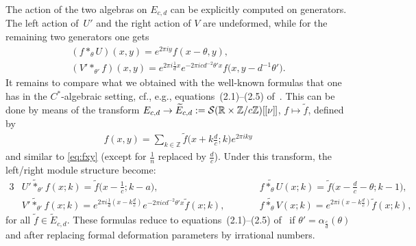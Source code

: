 \documentclass[10pt,a4paper]{amsart}
\numberwithin{equation}{section}
\theoremstyle{definition}
\newcommand{\R}{\mathbb{R}}
\newcommand{\Z}{\mathbb{Z}}
\newcommand{\mc}{\mathcal}
\newcommand{\lbrak}{[\hspace{-0.5pt}[}
\newcommand{\rbrak}{]\hspace{-0.5pt}]}
\renewcommand{\hbar}{\nu}
\begin{document}
The action of the two algebras on $E_{c,d}$ can be explicitly computed on generators.
The left action of~$U'$ and the right action of $V$ are undeformed, while for the remaining two generators one gets
\begin{gather*}
(f\ast_\theta U)(x,y) =e^{2\pi iy}f(x-\theta,y) , \\
(V'\ast_{\theta'} f)(x,y) =e^{2\pi i\frac{1}{d}x}e^{-2\pi icd^{-2}\theta'x}f\big(x,y-d^{-1}\theta'\big) .
\end{gather*}
It remains to compare what we obtained with the well-known formulas that one has in the $C^*$-algebraic setting, cf., e.g., equations~(2.1)--(2.5) of~\cite{Pla06}.
This can be done by means of the transform
$E_{c,d}\to\widetilde{E}_{c,d}:=\mc{S}(\R\times\Z/c\Z)\lbrak\hbar\rbrak$, $f\mapsto\widetilde{f}$, def\/ined by
\begin{gather*}
f(x,y)=\sum_{k\in\Z}\widetilde{f}\big(x+k\tfrac{d}{c};k\big)e^{2\pi iky}
\end{gather*}
and similar to \eqref{eq:fxy} (except for $\frac{1}{n}$ replaced by $\frac{d}{c}$).
Under this transform, the left/right module structure become:
\begin{alignat*}{3}
& \widetilde{U'\!\ast_{\theta'}\! f}(x;k) =\widetilde{f}\big(x-\tfrac{1}{c};k-a\big) ,\qquad &&
\widetilde{f\!\ast_\theta\! U}(x;k) =\widetilde{f}\big(x-\tfrac{d}{c}-\theta;k-1\big) , & \\
& \widetilde{V'\!\ast_{\theta'}\! f}(x;k) =e^{2\pi i\frac{1}{d}(x-k\frac{d}{c})}e^{-2\pi icd^{-2}\theta'x}\widetilde{f}(x;k) , \qquad &&
\widetilde{f\!\ast_\theta\! V}(x;k) =e^{2\pi i(x-k\frac{d}{c})}\widetilde{f}(x;k) ,&
\end{alignat*}
for all $\widetilde{f}\in\widetilde{E}_{c,d}$. These formulas reduce to
equations~(2.1)--(2.5) of~\cite{Pla06} if $\theta'=\alpha_{\frac{c}{d}}(\theta)$ and
after replacing formal deformation parameters by irrational numbers.

\end{document}
